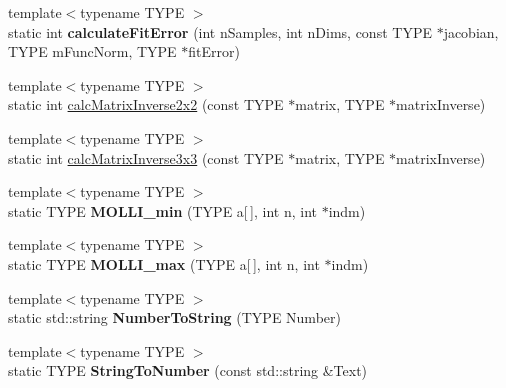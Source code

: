 \begin{DoxyCompactItemize}
\item 
{\footnotesize template$<$typename T\+Y\+PE $>$ }\\static int {\bfseries calculate\+Fit\+Error} (int n\+Samples, int n\+Dims, const T\+Y\+PE $\ast$jacobian, T\+Y\+PE m\+Func\+Norm, T\+Y\+PE $\ast$fit\+Error)\hypertarget{class_k_w_util_a0d35a6f3edd96c2932d9beab98b449dd}{}\label{class_k_w_util_a0d35a6f3edd96c2932d9beab98b449dd}

\item 
{\footnotesize template$<$typename T\+Y\+PE $>$ }\\static int \hyperlink{class_k_w_util_a2fc5e79357924fad528bcfe3e2d71732}{calc\+Matrix\+Inverse2x2} (const T\+Y\+PE $\ast$matrix, T\+Y\+PE $\ast$matrix\+Inverse)
\item 
{\footnotesize template$<$typename T\+Y\+PE $>$ }\\static int \hyperlink{class_k_w_util_a80504801c382f1ac367bcf0787fb18c2}{calc\+Matrix\+Inverse3x3} (const T\+Y\+PE $\ast$matrix, T\+Y\+PE $\ast$matrix\+Inverse)
\item 
{\footnotesize template$<$typename T\+Y\+PE $>$ }\\static T\+Y\+PE {\bfseries M\+O\+L\+L\+I\+\_\+min} (T\+Y\+PE a\mbox{[}$\,$\mbox{]}, int n, int $\ast$indm)\hypertarget{class_k_w_util_a6401111c5ce49eb97e1c79bae84b3868}{}\label{class_k_w_util_a6401111c5ce49eb97e1c79bae84b3868}

\item 
{\footnotesize template$<$typename T\+Y\+PE $>$ }\\static T\+Y\+PE {\bfseries M\+O\+L\+L\+I\+\_\+max} (T\+Y\+PE a\mbox{[}$\,$\mbox{]}, int n, int $\ast$indm)\hypertarget{class_k_w_util_af0fee5e9d89e7c029c346804480d5832}{}\label{class_k_w_util_af0fee5e9d89e7c029c346804480d5832}

\item 
{\footnotesize template$<$typename T\+Y\+PE $>$ }\\static std\+::string {\bfseries Number\+To\+String} (T\+Y\+PE Number)\hypertarget{class_k_w_util_a10aaa83c83c801ef07c95a29e1acdc4e}{}\label{class_k_w_util_a10aaa83c83c801ef07c95a29e1acdc4e}

\item 
{\footnotesize template$<$typename T\+Y\+PE $>$ }\\static T\+Y\+PE {\bfseries String\+To\+Number} (const std\+::string \&Text)\hypertarget{class_k_w_util_adea4c36750f518d1f2c90af14742a0f6}{}\label{class_k_w_util_adea4c36750f518d1f2c90af14742a0f6}


\end{DoxyCompactItemize}
